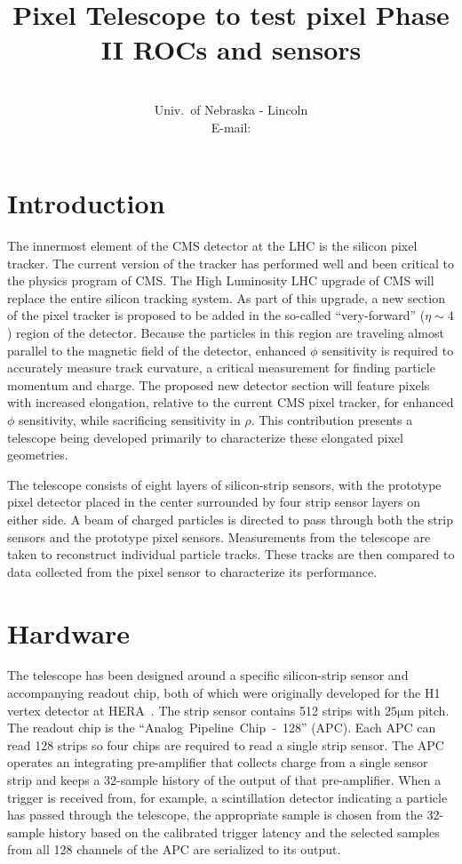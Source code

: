 \documentclass{PoS}
\title{Pixel Telescope to test pixel Phase II ROCs and sensors}
\author{\speaker{Caleb Fangmeier}\\
  Univ.\ of Nebraska \-- Lincoln\\
  E-mail: \email{cfangmei@cern.ch}}
\newcommand{\micron}{\si{\micro\meter}}
\begin{document}
\section{Introduction}

The innermost element of the CMS detector at the LHC is the silicon pixel
tracker. The current version of the tracker has performed well and been
critical to the physics program of CMS. The High Luminosity LHC upgrade of CMS
will replace the entire silicon tracking system.  As part of this upgrade, a
new section of the pixel tracker is proposed to be added in the so-called
``very-forward'' ($\eta\sim4$) region of the detector. Because the particles in
this region are traveling almost parallel to the magnetic field of the
detector, enhanced $\phi$ sensitivity is required to accurately measure track
curvature, a critical measurement for finding particle momentum and charge.
The proposed new detector section will feature pixels with increased elongation,
relative to the current CMS pixel tracker, for enhanced $\phi$ sensitivity,
while sacrificing sensitivity in $\rho$.  This contribution presents a
telescope being developed primarily to characterize these elongated pixel
geometries.

The telescope consists of eight layers of silicon-strip sensors, with the
prototype pixel detector placed in the center surrounded by four strip sensor
layers on either side. A beam of charged particles is directed to pass through
both the strip sensors and the prototype pixel sensors.  Measurements from the
telescope are taken to reconstruct individual particle tracks. These tracks are
then compared to data collected from the pixel sensor to characterize its
performance.

\section{Hardware}
The telescope has been designed around a specific silicon-strip sensor and
accompanying readout chip, both of which were originally developed for the H1
vertex detector at HERA~\cite{Hilgers2001}. The strip sensor contains 512
strips with $25\micron$ pitch. The readout chip is the
``Analog~Pipeline~Chip~\--~128'' (APC).  Each APC can read 128 strips so four
chips are required to read a single strip sensor. The APC operates an
integrating pre-amplifier that collects charge from a single sensor strip and
keeps a 32-sample history of the output of that pre-amplifier. When a trigger
is received from, for example, a scintillation detector indicating a particle
has passed through the telescope, the appropriate sample is chosen from the
32-sample history based on the calibrated trigger latency and the selected
samples from all 128 channels of the APC are serialized to its output.
\end{document}
